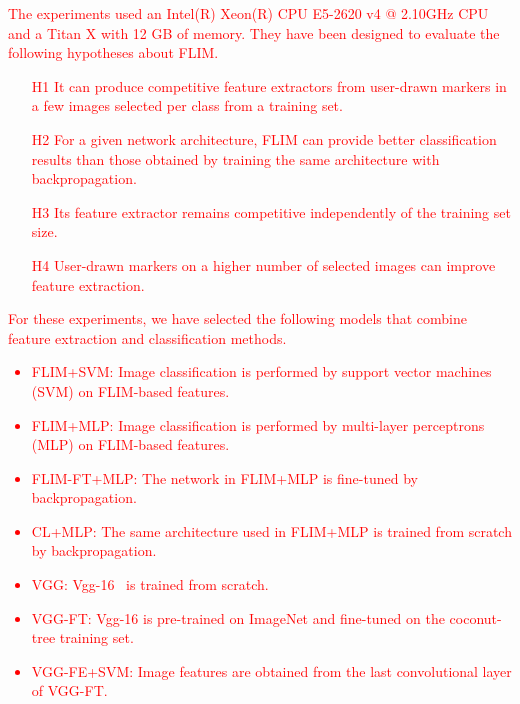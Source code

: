 \documentclass[journal, twoside]{IEEEtran}
\begin{document}
\textcolor{red}{The experiments used an Intel(R) Xeon(R) CPU E5-2620 v4 @ 2.10GHz CPU and a Titan X with 12 GB of memory. They have been designed to evaluate the following hypotheses about FLIM.
\begin{enumerate}
  \item[H1]  It can produce competitive feature extractors from user-drawn markers in a few images selected per class from a training set. 
  \item[H2]  For a given network architecture, FLIM can provide better classification results than those obtained by training the same architecture with backpropagation.
  \item[H3] Its feature extractor remains competitive independently of the training set size. 
  \item[H4] User-drawn markers on a higher number of selected images can improve feature extraction.
\end{enumerate}
}

\textcolor{red}{For these experiments, we have selected the following models that combine feature extraction and classification methods.
 \begin{itemize}
  \item FLIM+SVM: Image classification is performed by support vector machines (SVM) on FLIM-based features.  
  \item FLIM+MLP: Image classification is performed by multi-layer perceptrons (MLP) on FLIM-based features.  
  \item FLIM-FT+MLP: The network in FLIM+MLP is fine-tuned by backpropagation. 
  \item CL+MLP: The same architecture used in FLIM+MLP is trained from scratch by backpropagation.
  \item VGG: Vgg-16~\cite{simonyan2014very} is trained from scratch.
  \item VGG-FT: Vgg-16 is pre-trained on ImageNet and fine-tuned on the coconut-tree training set.
  \item VGG-FE+SVM: Image features are obtained from the last convolutional layer of VGG-FT.
\end{itemize}
}
\end{document}
